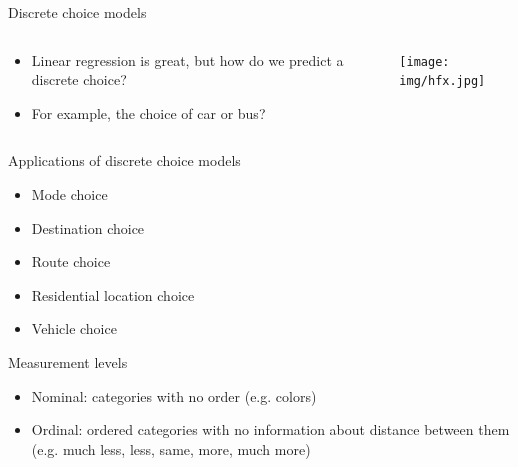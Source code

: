 \begin{frame}{Discrete choice models}
  \begin{columns}
    \begin{column}{0.65\textwidth}
      \begin{itemize}
        \item Linear regression is great, but how do we predict a discrete choice?
        \item For example, the choice of car or bus?
      \end{itemize}
    \end{column}~%
    \begin{column}{0.34\textwidth}
      \texttt{[image: img/hfx.jpg]}
    \end{column}
  \end{columns}
\end{frame}

\begin{frame}{Applications of discrete choice models}
  \begin{itemize}
    \item Mode choice
    \item Destination choice
    \item Route choice
    \item Residential location choice
    \item Vehicle choice
  \end{itemize}
\end{frame}

\begin{frame}{Measurement levels}
  \begin{itemize}
    \item Nominal: \pause categories with no order (e.g. colors)
    \pause\item Ordinal: \pause ordered categories with no information about distance between them (e.g. much less, less, same, more, much more)
     
  \end{itemize}
\end{frame}

